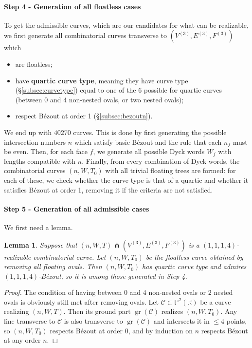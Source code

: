 \documentclass[11pt,reqno]{amsart}
\theoremstyle{plain}
\newtheorem{lemma}[subsection]{Lemma}
\theoremstyle{definition}
\theoremstyle{remark}
\numberwithin{equation}{subsection}
\newcommand*{\bbP}{\mathbb{P}}
\newcommand*{\bbR}{\mathbb{R}}
\newcommand*{\calC}{\mathcal{C}}
\DeclareMathOperator{\gr}{gr}
\begin{document}
\paragraph{\textbf{Step 4 - Generation of all floatless cases}} To get the admissible curves, which are our candidates for what can be realizable, we first generate all combinatorial curves transverse to $(V^{(3)},E^{(3)},F^{(3)})$ which
\begin{itemize}
    \item are floatless;
    \item have \textbf{quartic curve type}, meaning they have curve type (§\ref{subsec:curvetype}) equal to one of the 6 possible for quartic curves (between 0 and 4 non-nested ovals, or two nested ovals);
    \item respect Bézout at order 1 (§\ref{subsec:bezoutn}).
\end{itemize}
We end up with 40270 curves. This is done by first generating the possible intersection numbers $n$ which satisfy basic Bézout and the rule that each $n_f$ must be even. Then, for each face $f$, we generate all possible Dyck words $W_f$ with lengths compatible with $n$. Finally, from every combination of Dyck words, the combinatorial curves $(n,W,T_0)$ with all trivial floating trees are formed: for each of these, we check whether the curve type is that of a quartic and whether it satisfies Bézout at order 1, removing it if the criteria are not satisfied.

\paragraph{\textbf{Step 5 - Generation of all admissible cases}} We first need a lemma.

\begin{lemma}
    Suppose that $(n,W,T)\pitchfork(V^{(3)},E^{(3)},F^{(3)})$ is a $(1,1,1,4)$-realizable combinatorial curve. Let $(n,W,T_0)$ be the floatless curve obtained by removing all floating ovals. Then $(n,W,T_0)$ has quartic curve type and admires $(1,1,1,4)$-Bézout, so it is among those generated in Step 4.
\end{lemma}
\begin{proof}
    The condition of having between 0 and 4 non-nested ovals or 2 nested ovals is obviously still met after removing ovals. Let $\calC\subset\bbP^2(\bbR)$ be a curve realizing $(n,W,T)$. Then its ground part $\gr(\calC)$ realizes $(n,W,T_0)$. Any line transverse to $\calC$ is also transverse to $\gr(\calC)$ and intersects it in $\le4$ points, so $(n,W,T_0)$ respects Bézout at order 0, and by induction on $n$ respects Bézout at any order $n$.
\end{proof}
\end{document}
